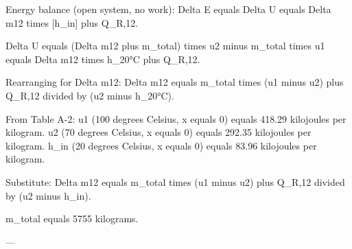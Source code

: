Energy balance (open system, no work):  
Delta E equals Delta U equals Delta m12 times [h_in] plus Q_R,12.  

Delta U equals (Delta m12 plus m_total) times u2 minus m_total times u1 equals Delta m12 times h_20°C plus Q_R,12.  

Rearranging for Delta m12:  
Delta m12 equals m_total times (u1 minus u2) plus Q_R,12 divided by (u2 minus h_20°C).  

From Table A-2:  
u1 (100 degrees Celsius, x equals 0) equals 418.29 kilojoules per kilogram.  
u2 (70 degrees Celsius, x equals 0) equals 292.35 kilojoules per kilogram.  
h_in (20 degrees Celsius, x equals 0) equals 83.96 kilojoules per kilogram.  

Substitute:  
Delta m12 equals m_total times (u1 minus u2) plus Q_R,12 divided by (u2 minus h_in).  

m_total equals 5755 kilograms.  

---